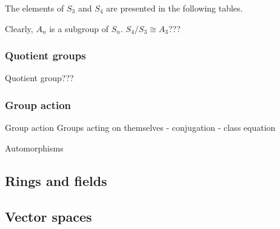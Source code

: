 \begin{example}[$A_3$ and $A_4$]
	The elements of $S_3$ and $S_4$ are presented in the following tables.
	
\end{example}

Clearly, $A_n$ is a subgroup of $S_n$. $S_4/S_3 \cong A_3$???

\subsubsection{Quotient groups}

Quotient group???

\subsubsection{Group action}

Group action
Groups acting on themselves - conjugation - class equation

Automorphisms

\subsection{Rings and fields}

\subsection{Vector spaces}
